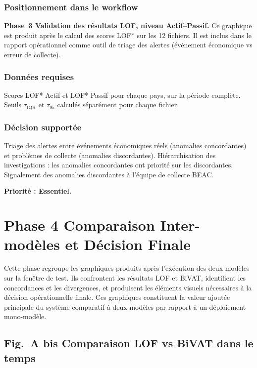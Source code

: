 \documentclass[12pt,a4paper]{article}
\begin{document}
\subsubsection{Positionnement dans le workflow}

\textbf{Phase~3  Validation des résultats LOF, niveau Actif--Passif.}
Ce graphique est produit après le calcul des scores LOF* sur les 12 fichiers.
Il est inclus dans le rapport opérationnel comme outil de triage des alertes
(événement économique vs erreur de collecte).

\subsubsection{Données requises}

Scores LOF* Actif et LOF* Passif pour chaque pays, sur la période complète.
Seuils $\tau_{\mathrm{IQR}}$ et $\tau_{95}$ calculés séparément pour chaque
fichier.

\subsubsection{Décision supportée}

Triage des alertes entre événements économiques réels (anomalies concordantes)
et problèmes de collecte (anomalies discordantes). Hiérarchisation des
investigations : les anomalies concordantes ont priorité sur les discordantes.
Signalement des anomalies discordantes à l'équipe de collecte BEAC.

\textbf{Priorité : Essentiel.}
\section{Phase 4  Comparaison Inter-modèles et Décision Finale}

Cette phase regroupe les graphiques produits après l'exécution des deux
modèles sur la fenêtre de test. Ils confrontent les résultats LOF et BiVAT,
identifient les concordances et les divergences, et produisent les éléments
visuels nécessaires à la décision opérationnelle finale. Ces graphiques
constituent la valeur ajoutée principale du système comparatif à deux
modèles par rapport à un déploiement mono-modèle.

\subsection{Fig.~A bis  Comparaison LOF vs BiVAT dans le temps}
\label{subsec:figD}
\end{document}
